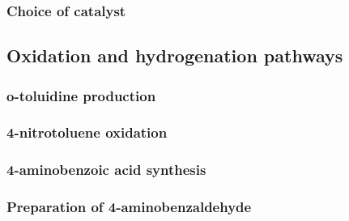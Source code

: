 \begin{comment}
Nitric acid has been selected as the source of nitrogen for the nitration of toluene among the various candidates. Although nitric acid is a highly acidic and volatile compound, [] compared to alternatives such as acetone cyanohydrin and dinitrogen tetroxide which are highly toxic, nitric acid is much safer and more environmentally friendly. [] 
Industrially, nitric acid is the most commonly used nitrating agent for the nitration of toluene. (cite Ullmann's toluidine) It is typically introduced into the process as an aqueous solution. As some studies have suggested, one of the distinct advantages of nitric acid is that due to its strong acidity, it can act as a self-catalyst by self-donation of proton during the nitration of toluene, (cite that nice paper), though a strong acidic catalyst such as sulfuric acid or zeolite is nevertheless recommended in a typical process. A common alternative to nitric acid is acetyl nitrate, which is formed by the reaction of nitric acid with acetic anhydride. But compared to having just nitric acid as the nitrating agent, this reaction causes extra difficulties in separations downstream by introducing more components into the process; it also yields methanoic acid as by-product, which results in a lower atom economy []. The same argument can be employed for other alkyl nitrates such as butyl nitrate. 
\end{comment}

\subsubsection{Choice of catalyst}

\subsection{Oxidation and hydrogenation pathways}
\subsubsection{o-toluidine production}

\subsubsection{4-nitrotoluene oxidation}

\subsubsection{4-aminobenzoic acid synthesis}

\subsubsection{Preparation of 4-aminobenzaldehyde}

